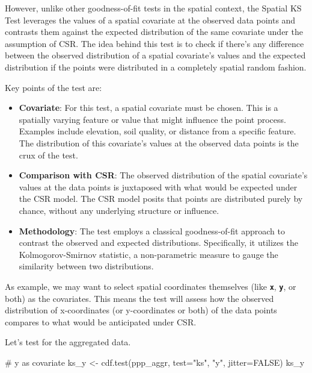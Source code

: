 \documentclass[
  letterpaper,
]{book}
\newenvironment{Shaded}{\begin{snugshade}}{\end{snugshade}}
\newcommand{\AttributeTok}[1]{\textcolor[rgb]{0.40,0.45,0.13}{#1}}
\newcommand{\CommentTok}[1]{\textcolor[rgb]{0.37,0.37,0.37}{#1}}
\newcommand{\ConstantTok}[1]{\textcolor[rgb]{0.56,0.35,0.01}{#1}}
\newcommand{\FunctionTok}[1]{\textcolor[rgb]{0.28,0.35,0.67}{#1}}
\newcommand{\NormalTok}[1]{\textcolor[rgb]{0.00,0.23,0.31}{#1}}
\newcommand{\OtherTok}[1]{\textcolor[rgb]{0.00,0.23,0.31}{#1}}
\newcommand{\StringTok}[1]{\textcolor[rgb]{0.13,0.47,0.30}{#1}}
\begin{document}
However, unlike other goodness-of-fit tests in the spatial context, the
Spatial KS Test leverages the values of a spatial covariate at the
observed data points and contrasts them against the expected
distribution of the same covariate under the assumption of CSR. The idea
behind this test is to check if there's any difference between the
observed distribution of a spatial covariate's values and the expected
distribution if the points were distributed in a completely spatial
random fashion.

Key points of the test are:

\begin{itemize}
\item
  \textbf{Covariate}: For this test, a spatial covariate must be chosen.
  This is a spatially varying feature or value that might influence the
  point process. Examples include elevation, soil quality, or distance
  from a specific feature. The distribution of this covariate's values
  at the observed data points is the crux of the test.
\item
  \textbf{Comparison with CSR}: The observed distribution of the spatial
  covariate's values at the data points is juxtaposed with what would be
  expected under the CSR model. The CSR model posits that points are
  distributed purely by chance, without any underlying structure or
  influence.
\item
  \textbf{Methodology}: The test employs a classical goodness-of-fit
  approach to contrast the observed and expected distributions.
  Specifically, it utilizes the Kolmogorov-Smirnov statistic, a
  non-parametric measure to gauge the similarity between two
  distributions.
\end{itemize}

As example, we may want to select spatial coordinates themselves (like
\textbf{\texttt{x}}, \textbf{\texttt{y}}, or both) as the covariates.
This means the test will assess how the observed distribution of
x-coordinates (or y-coordinates or both) of the data points compares to
what would be anticipated under CSR.

Let's test for the aggregated data.

\begin{Shaded}
\begin{Highlighting}[]
\CommentTok{\# y as covariate}
\NormalTok{ks\_y }\OtherTok{\textless{}{-}} \FunctionTok{cdf.test}\NormalTok{(ppp\_aggr, }\AttributeTok{test=}\StringTok{"ks"}\NormalTok{, }\StringTok{"y"}\NormalTok{, }\AttributeTok{jitter=}\ConstantTok{FALSE}\NormalTok{)}
\NormalTok{ks\_y}
\end{Highlighting}
\end{Shaded}
\end{document}
